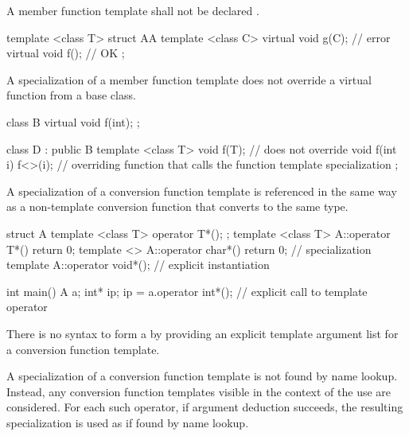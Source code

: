 \pnum
A member function template shall not be declared .
\begin{example}
\begin{codeblock}
template <class T> struct AA {
  template <class C> virtual void g(C);             // error
  virtual void f();                                 // OK
};
\end{codeblock}
\end{example}

\pnum
A specialization of
a member function template does not override a virtual function from a
base class.
\begin{example}
\begin{codeblock}
class B {
  virtual void f(int);
};

class D : public B {
  template <class T> void f(T); // does not override 
  void f(int i) { f<>(i); }     // overriding function that calls the function template specialization
};
\end{codeblock}
\end{example}

\pnum
A specialization of a
conversion function template
is referenced in
the same way as a non-template conversion function that converts to
the same type.
\begin{example}
\begin{codeblock}
struct A {
  template <class T> operator T*();
};
template <class T> A::operator T*(){ return 0; }
template <> A::operator char*(){ return 0; }        // specialization
template A::operator void*();                       // explicit instantiation

int main() {
  A a;
  int* ip;
  ip = a.operator int*();       // explicit call to template operator 
}
\end{codeblock}
\end{example}
\begin{note}
There is no syntax to form a 
by providing an explicit template argument list
for a conversion function template.
\end{note}

\pnum
A specialization of a
conversion function template
is not found by name
lookup.
Instead, any
conversion function templates
visible in the
context of the use are considered.
For each such operator, if argument
deduction succeeds, the resulting specialization is
used as if found by name lookup.

